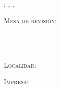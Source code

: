 
\thispagestyle{empty}

\hfill

\vfill

\noindent\myName: \textit{\myTitle,} \mySubtitle, %
\textcopyright\ \myTime

\bigskip

\noindent\textsc{Mesa de revisión}: \\
\myProf \\
\myOtherProf \\ 
\mySupervisor \\
\myOtherSupervisor

\medskip 

\noindent\textsc{Localidad}: \\
\myLocation

\medskip 

\noindent\textsc{Impresa}: \\
\myTime
